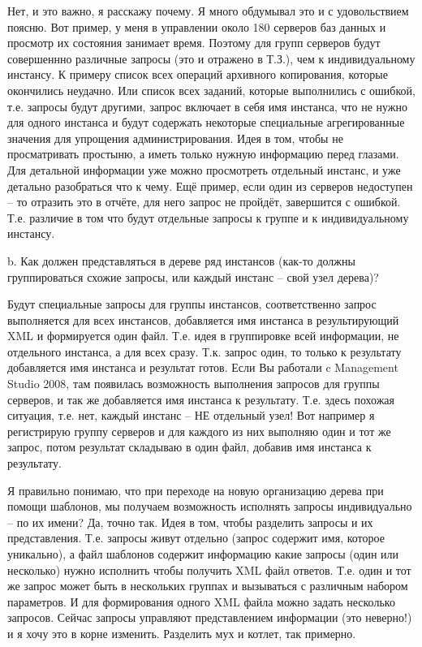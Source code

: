 \documentclass[10pt,a4paper]{article}
\begin{document}
Нет, и это важно, я расскажу почему. Я много обдумывал это и с удовольствием
поясню. Вот пример, у меня в управлении около 180 серверов баз данных и просмотр
их состояния занимает время. Поэтому для групп серверов будут совершеннно
различные запросы (это и отражено в Т.З.), чем к индивидуальному инстансу. К
примеру список всех операций архивного копирования, которые окончились неудачно.
Или список всех заданий, которые выполнились с ошибкой, т.е. запросы будут
другими, запрос включает в себя имя инстанса, что не нужно для одного инстанса и
будут содержать некоторые специальные агрегированные значения для упрощения
администрирования. Идея в том, чтобы не просматривать простыню, а иметь только
нужную информацию перед глазами. Для детальной информации уже можно просмотреть
отдельный инстанс, и уже детально разобраться что к чему. Ещё пример, если один
из серверов недоступен – то отразить это в отчёте, для него запрос не пройдёт,
завершится с ошибкой. Т.е. различие в том что будут отдельные запросы к группе и
к индивидуальному инстансу.

b. Как должен представляться в дереве ряд инстансов (как-то должны
группироваться схожие запросы, или каждый инстанс – свой узел дерева)?

Будут специальные запросы для группы инстансов, соответственно запрос
выполняется для всех инстансов, добавляется имя инстанса в результирующий XML и
формируется один файл. Т.е. идея в группировке всей информации, не отдельного
инстанса, а для всех сразу. Т.к. запрос один, то только к результату добавляется
имя инстанса и результат готов. Если Вы работали c Management Studio 2008, там
появилась возможность выполнения запросов для группы серверов, и так же
добавляется имя инстанса к результату. Т.е. здесь похожая ситуация, т.е. нет,
каждый инстанс – НЕ отдельный узел! Вот например я регистрирую группу серверов и
для каждого из них выполняю один и тот же запрос, потом результат складываю в
один файл, добавив имя инстанса к результату.

Я правильно понимаю, что при переходе на новую организацию дерева при помощи
шаблонов, мы получаем возможность исполнять запросы индивидуально – по их имени?
Да, точно так. Идея в том, чтобы разделить запросы и их представления. Т.е.
запросы живут отдельно (запрос содержит имя, которое уникально), а файл шаблонов
содержит информацию какие запросы (один или несколько) нужно исполнить чтобы
получить XML файл ответов. Т.е. один и тот же запрос может быть в нескольких
группах и вызываться с различным набором параметров. И для формирования одного
XML файла можно задать несколько запросов. Сейчас запросы управляют
представлением информации (это неверно!) и я хочу это в корне изменить.
Разделить мух и котлет, так примерно.
\end{document}
